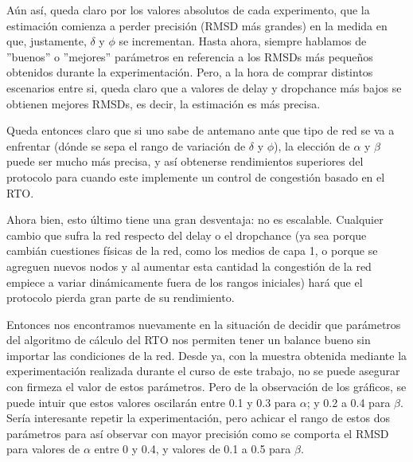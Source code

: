 \par A\'un as\'i, queda claro por los valores absolutos de cada experimento, que
la estimaci\'on comienza a perder precisi\'on (RMSD m\'as grandes) en la medida
en que, justamente, $\delta$ y $\phi$ se incrementan. Hasta ahora, siempre
hablamos de ''buenos'' o ''mejores'' par\'ametros en referencia a los RMSDs
m\'as peque\~nos obtenidos durante la experimentaci\'on. Pero, a la hora de
comprar distintos escenarios entre si, queda claro que a valores de delay y
dropchance m\'as bajos se obtienen mejores RMSDs, es decir, la estimaci\'on es
m\'as precisa.

\par Queda entonces claro que si uno sabe de antemano ante que tipo de red se va
a enfrentar (d\'onde se sepa el rango de variaci\'on de $\delta$ y $\phi$), la
elecci\'on de $\alpha$ y $\beta$ puede ser mucho m\'as precisa, y as\'i
obtenerse rendimientos superiores del protocolo para cuando este implemente un
control de congesti\'on basado en el RTO.

\par Ahora bien, esto \'ultimo tiene una gran desventaja: no es escalable.
Cualquier cambio que sufra la red respecto del delay o el dropchance (ya sea
porque cambi\'an cuestiones f\'isicas de la red, como los medios de capa 1, o
porque se agreguen nuevos nodos y al aumentar esta cantidad la congesti\'on de
la red empiece a variar din\'amicamente fuera de los rangos iniciales) har\'a
que el protocolo pierda gran parte de su rendimiento.

\par Entonces nos encontramos nuevamente en la situaci\'on de decidir que
par\'ametros del algoritmo de c\'alculo del RTO nos permiten tener un balance
bueno sin importar las condiciones de la red. Desde ya, con la muestra
obtenida mediante la experimentaci\'on realizada durante el curso de este
trabajo, no se puede asegurar con firmeza el valor de estos par\'ametros. Pero
de la observaci\'on de los gr\'aficos, se puede intuir que estos valores
oscilar\'an entre 0.1 y 0.3 para $\alpha$; y 0.2 a 0.4 para $\beta$. Ser\'ia
interesante repetir la experimentaci\'on, pero achicar el rango de estos dos
par\'ametros para as\'i observar con mayor precisi\'on como se comporta el RMSD
para valores de $\alpha$ entre 0 y 0.4, y valores de 0.1 a 0.5 para $\beta$.

